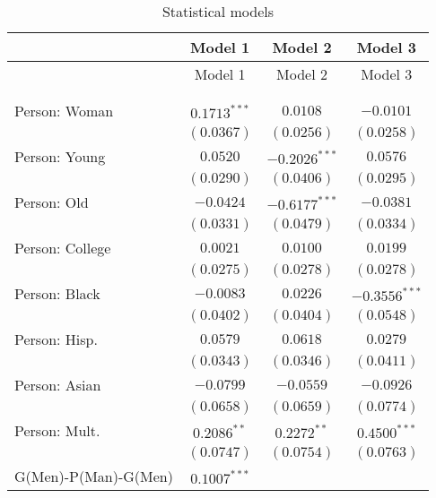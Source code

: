 
\begin{center}
\begin{longtable}{l c c c}
\toprule
 & Model 1 & Model 2 & Model 3 \\
\midrule
\endfirsthead
\toprule
 & Model 1 & Model 2 & Model 3 \\
\midrule
\endhead
\bottomrule
\endfoot
\bottomrule
\multicolumn{4}{l}{\scriptsize{$^{***}p<0.001$; $^{**}p<0.01$; $^{*}p<0.05$}}\\
\caption{Statistical models}
\label{table:coefficients}
\endlastfoot \\
Person: Woman              & $0.1713^{***}$ & $0.0108$        & $-0.0101$       \\
                           & $(0.0367)$     & $(0.0256)$      & $(0.0258)$      \\
Person: Young              & $0.0520$       & $-0.2026^{***}$ & $0.0576$        \\
                           & $(0.0290)$     & $(0.0406)$      & $(0.0295)$      \\
Person: Old                & $-0.0424$      & $-0.6177^{***}$ & $-0.0381$       \\
                           & $(0.0331)$     & $(0.0479)$      & $(0.0334)$      \\
Person: College            & $0.0021$       & $0.0100$        & $0.0199$        \\
                           & $(0.0275)$     & $(0.0278)$      & $(0.0278)$      \\
Person: Black              & $-0.0083$      & $0.0226$        & $-0.3556^{***}$ \\
                           & $(0.0402)$     & $(0.0404)$      & $(0.0548)$      \\
Person: Hisp.              & $0.0579$       & $0.0618$        & $0.0279$        \\
                           & $(0.0343)$     & $(0.0346)$      & $(0.0411)$      \\
Person: Asian              & $-0.0799$      & $-0.0559$       & $-0.0926$       \\
                           & $(0.0658)$     & $(0.0659)$      & $(0.0774)$      \\
Person: Mult.              & $0.2086^{**}$  & $0.2272^{**}$   & $0.4500^{***}$  \\
                           & $(0.0747)$     & $(0.0754)$      & $(0.0763)$      \\
G(Men)-P(Man)-G(Men)       & $0.1007^{***}$ &                 &                 \\

\end{longtable}
\end{center}
